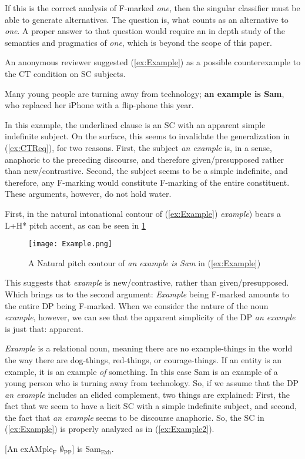 \documentclass[
]{RCL}
\begin{document}
If this is the correct analysis of F-marked \textit{one}, then the singular classifier must be able to generate alternatives.
The question is, what counts as an alternative to \textit{one}.
A proper answer to that question would require an in depth study of the semantics and pragmatics of \textit{one}, which is beyond the scope of this paper.


An anonymous reviewer suggested (\ref{ex:Example}) as a possible counterexample to the CT condition on SC subjects.
\begin{exe}
	\ex\label{ex:Example} Many young people are turning away from technology; \textbf{an example is Sam}, who replaced her iPhone with a flip-phone this year.
\end{exe}
In this example, the underlined clause is an SC with an apparent simple indefinite subject.
On the surface, this seems to invalidate the generalization in (\ref{ex:CTReq}), for two reasons.
First, the subject \textit{an example} is, in a sense, anaphoric to the preceding discourse, and therefore given/presupposed rather than new/contrastive.
Second, the subject seems to be a simple indefinite, and therefore, any F-marking would constitute F-marking of the entire constituent.
These arguments, however, do not hold water.

First, in the natural intonational contour of (\ref{ex:Example}) \textit{example}) bears a L+H* pitch accent, as can be seen in \ref{fig:Example}
\begin{figure}[h]
	\centering
	\texttt{[image: Example.png]}
	\caption{A Natural pitch contour of \textit{an example is Sam} in (\ref{ex:Example})}
	\label{fig:Example}
\end{figure}
This suggests that \textit{example} is new/contrastive, rather than given/presupposed.
Which brings us to the second argument: \textit{Example} being F-marked amounts to the entire DP being F-marked.
When we consider the nature of the noun \textit{example}, however, we can see that the apparent simplicity of the DP \textit{an example} is just that: apparent.

\textit{Example} is a relational noun, meaning there are no example-things in the world the way there are dog-things, red-things, or courage-things.
If an entity is an example, it is an example \textit{of} something.
In this case Sam is an example of a young person who is turning away from technology.
So, if we assume that the DP \textit{an example} includes an elided complement, two things are explained:
First, the fact that we seem to have a licit SC with a simple indefinite subject, and second, the fact that \textit{an example} seems to be discourse anaphoric.
So, the SC in (\ref{ex:Example}) is properly analyzed as in (\ref{ex:Example2}).
\begin{exe}	
	\ex \label{ex:Example2} [An exAMple$_\text{F}$ $\emptyset_\text{PP}$] is Sam$_\text{Exh}$.
\end{exe}
\end{document}
